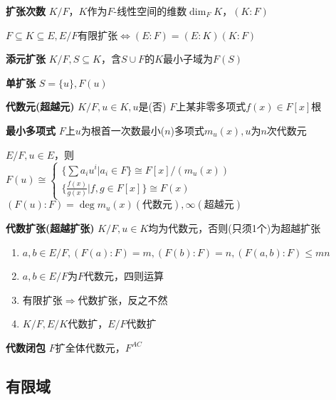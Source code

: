 \documentclass[a4paper,10pt]{ctexart}
\newcommand*{\impl}{\Rightarrow}
\renewcommand*{\iff}{\Leftrightarrow}
\renewcommand*{\leq}{\leqslant}
\newcommand*{\set}[1]{\{#1\}}
\begin{document}
\begin{multicols}{3}
    \textbf{扩张次数} $K/F$，$K$作为$F$-线性空间的维数$\dim_F K$，$(K:F)$

    \begin{theorem}[链式法则]
        $F\subseteq K \subseteq E, E/F$有限扩张$\iff (E:F)=(E:K)(K:F)$
    \end{theorem}

    \textbf{添元扩张} $K/F, S\subseteq K$，含$S\cup F$的$K$最小子域为$F(S)$

    \textbf{单扩张} $S = \set{u}, F(u)$

    \textbf{代数元(超越元)} $K/F, u\in K, u$是(否) $F$上某非零多项式$f(x)\in F[x]$根

    \textbf{最小多项式} $F$上$u$为根首一次数最小($n$)多项式$m_u(x), u$为$n$次代数元

    \begin{theorem}[单扩张定理]
        $E/F, u \in E$，则\\
        $F(u) \cong \begin{cases}
                \{ \sum a_i u^i | a_i \in F \} \cong F[x]/(m_u(x)) \\
                \{ \frac{f(x)}{g(x)} | f,g \in F[x] \} \cong F(x)
            \end{cases}$\\
        $(F(u)\!:\!F) = \deg m_u(x) (\text{代数元}), \infty (\text{超越元})$
    \end{theorem}

    \textbf{代数扩张(超越扩张)} $K/F, u \in K$均为代数元，否则(只须1个)为超越扩张

    \begin{theorem}[代数扩张性质]
        \hfil

        \begin{enumerate}
            \item $a, b \in E/F, (F(a)\!:\!F) \! = \! m, (F(b)\!:\!F) \! = \! n, (F(a,b)\!:\!F) \!\leq\! mn$
            \item $a,b \!\in\! E/F$为$F$代数元，四则运算\checkmark
            \item 有限扩张$\impl$代数扩张，反之不然
            \item $K/F, E/K$代数扩，$E/F$代数扩
        \end{enumerate}
    \end{theorem}

    \textbf{代数闭包} $F$扩全体代数元，$F^{AC}$

    \subsection{有限域}


\end{multicols}
\end{document}
